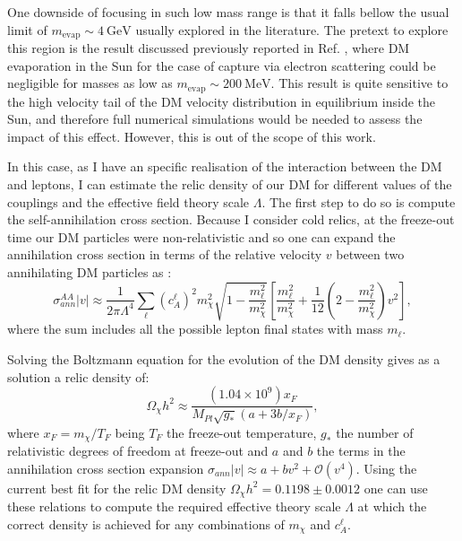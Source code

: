 One downside of focusing in such low mass range is that it falls bellow the usual limit of $m_{\mathrm{evap}} \sim 4 \ \mathrm{GeV}$ usually explored in the literature. The pretext to explore this region is the result discussed previously reported in Ref. \cite{Palomares2017}, where DM evaporation in the Sun for the case of capture via electron scattering could be negligible for masses as low as $m_{\mathrm{evap}} \sim 200 \ \mathrm{MeV}$. This result is quite sensitive to the high velocity tail of the DM velocity distribution in equilibrium inside the Sun, and therefore full numerical simulations would be needed to assess the impact of this effect. However, this is out of the scope of this work.

In this case, as I have an specific realisation of the interaction between the DM and leptons, I can estimate the relic density of our DM for different values of the couplings and the effective field theory scale $\Lambda$. The first step to do so is compute the self-annihilation cross section. Because I consider cold relics, at the freeze-out time our DM particles were non-relativistic and so one can expand the annihilation cross section in terms of the relative velocity $v$ between two annihilating DM particles as \cite{Beltran2008}:
\begin{equation}\label{7.4}
	\sigma_{ann}^{AA}|v| \approx \frac{1}{2\pi\Lambda^{4}} \sum_{\ell} \left(c_{A}^{\ell}\right)^{2} m_{\chi}^{2} \sqrt{1-\frac{m_{\ell}^{2}}{m_{\chi}^{2}}} \left[\frac{m_{\ell}^{2}}{m_{\chi}^{2}}+\frac{1}{12}\left(2-\frac{m_{\ell}^{2}}{m_{\chi}^{2}}\right)v^{2}\right],
\end{equation}
where the sum includes all the possible lepton final states with mass $m_{\ell}$.

Solving the Boltzmann equation for the evolution of the DM density gives as a solution a relic density of:
\begin{equation}\label{7.5}
	\Omega_{\chi} h^{2} \approx \frac{(1.04 \times 10^{9}) x_{F}}{M_{Pl} \sqrt{g_{*}}(a+3b/x_{F})},
\end{equation}
where $x_{F} = m_{\chi}/T_{F}$ being $T_{F}$ the freeze-out temperature, $g_{*}$ the number of relativistic degrees of freedom at freeze-out and $a$ and $b$ the terms in the annihilation cross section expansion $\sigma_{ann} |v| \approx a + b v^{2} + \mathcal{O}(v^{4})$. Using the current best fit for the relic DM density $\Omega_{\chi} h^{2} = 0.1198 \pm 0.0012$ \cite{Planck2018} one can use these relations to compute the required effective theory scale $\Lambda$ at which the correct density is achieved for any combinations of $m_{\chi}$ and $c_{A}^{\ell}$.

